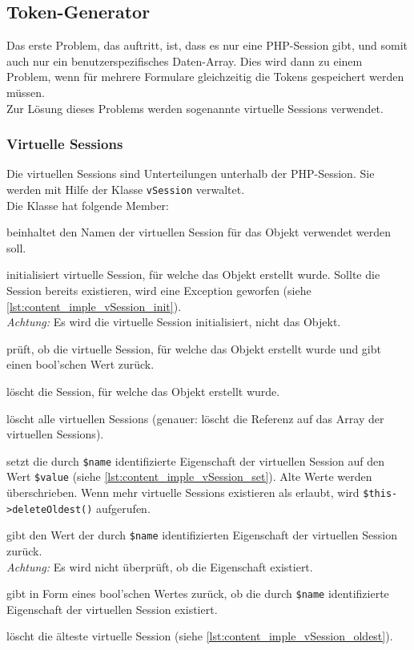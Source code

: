 \subsection{Token-Generator}
\label{sec:content_imple_hashgenerator}

Das erste Problem, das auftritt, ist, dass es nur eine PHP-Session gibt, und somit auch nur ein benutzerspezifisches Daten-Array. Dies wird dann zu einem Problem, wenn für mehrere Formulare gleichzeitig die Tokens gespeichert werden müssen.\\
Zur Lösung dieses Problems werden sogenannte virtuelle Sessions verwendet.

\subsubsection{Virtuelle Sessions}
Die virtuellen Sessions sind Unterteilungen unterhalb der PHP-Session. Sie werden mit Hilfe der Klasse \texttt{vSession} verwaltet.\\
Die Klasse hat folgende Member:
\begin{description}[style=nextline]
	\item[\texttt{private \$name}] beinhaltet den Namen der virtuellen Session für das Objekt verwendet werden soll.
	\item[\texttt{public function init()}] initialisiert virtuelle Session, für welche das Objekt erstellt wurde. Sollte die Session bereits existieren, wird eine Exception geworfen (siehe \autoref{lst:content_imple_vSession_init}).\\
		\textit{Achtung:} Es wird die virtuelle Session initialisiert, nicht das Objekt.
	\item[\texttt{public function exists()}] prüft, ob die virtuelle Session, für welche das Objekt erstellt wurde und gibt einen bool'schen Wert zurück.
	\item[\texttt{public function destroy()}] löscht die Session, für welche das Objekt erstellt wurde.
	\item[\texttt{public function destroyAll()}] löscht alle virtuellen Sessions (genauer: löscht die Referenz auf das Array der virtuellen Sessions).
	\item[\texttt{public function setAttribute(\$name, \$value)}] setzt die durch \texttt{\$name} identifizierte Eigenschaft der virtuellen Session auf den Wert \texttt{\$value} (siehe \autoref{lst:content_imple_vSession_set}). Alte Werte werden überschrieben. Wenn mehr virtuelle Sessions existieren als erlaubt, wird \texttt{\$this->deleteOldest()} aufgerufen.
	\item[\texttt{public function getAttribute(\$name)}] gibt den Wert der durch \texttt{\$name} identifizierten Eigenschaft der virtuellen Session zurück.\\
		\textit{Achtung:} Es wird nicht überprüft, ob die Eigenschaft existiert.
	\item[\texttt{public function attributeIsset(\$name)}] gibt in Form eines bool'schen Wertes zurück, ob die durch \texttt{\$name} identifizierte Eigenschaft der virtuellen Session existiert.
	\item[\texttt{public function deleteOldest()}] löscht die älteste virtuelle Session (siehe \autoref{lst:content_imple_vSession_oldest}).
\end{description}
